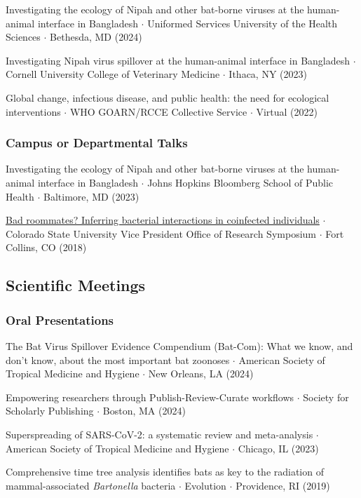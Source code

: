 \documentclass{cv}
\begin{document}
Investigating the ecology of Nipah and other bat-borne viruses at the human-animal interface in Bangladesh $\cdot$ Uniformed Services University of the Health Sciences $\cdot$ Bethesda, MD (2024)

Investigating Nipah virus spillover at the human-animal interface in Bangladesh $\cdot$ Cornell University College of Veterinary Medicine $\cdot$ Ithaca, NY (2023)

Global change, infectious disease, and public health: the need for ecological interventions $\cdot$ WHO GOARN/RCCE Collective Service $\cdot$ Virtual (2022)

\subsubsection*{Campus or Departmental Talks}

Investigating the ecology of Nipah and other bat-borne viruses at the human-animal interface in Bangladesh $\cdot$ Johns Hopkins Bloomberg School of Public Health $\cdot$ Baltimore, MD (2023)

\href{https://www.youtube.com/watch?v=lYWR_dZRdjE}{Bad roommates? Inferring bacterial interactions in coinfected individuals} $\cdot$ Colorado State University Vice President Office of Research Symposium $\cdot$ Fort Collins, CO (2018)

\subsection*{Scientific Meetings}

\subsubsection*{Oral Presentations}

The Bat Virus Spillover Evidence Compendium (Bat-Com): What we know, and don’t know, about the most important bat zoonoses $\cdot$ American Society of Tropical Medicine and Hygiene $\cdot$ New Orleans, LA (2024)

Empowering researchers through Publish-Review-Curate workflows $\cdot$ Society for Scholarly Publishing $\cdot$ Boston, MA (2024)

Superspreading of SARS-CoV-2: a systematic review and meta-analysis $\cdot$ American Society of Tropical Medicine and Hygiene $\cdot$ Chicago, IL (2023)

Comprehensive time tree analysis identifies bats as key to the radiation of mammal-associated \textit{Bartonella} bacteria $\cdot$ Evolution $\cdot$ Providence, RI (2019)
\end{document}

